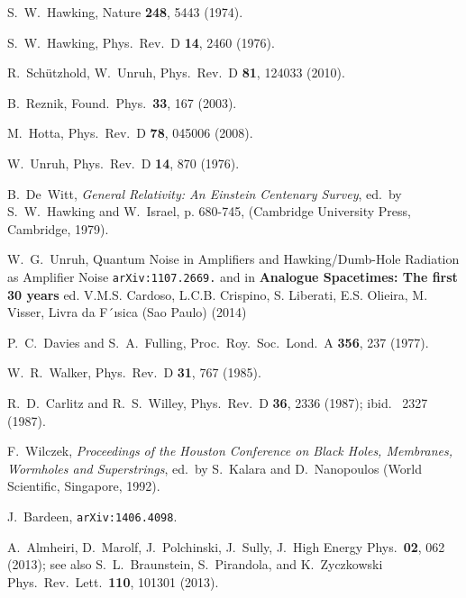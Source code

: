 \documentclass[aps,prd,showpacs,amssymb,nofootinbib,12pt]{revtex4-2}
\begin{document}
\begin{thebibliography}{000}

S.\  W.\ Hawking, Nature {\bf 248}, 5443 (1974). 

S.\ W.\ Hawking, Phys.\ Rev.\ D {\bf 14}, 2460 (1976).  

R.\ Sch\"utzhold, W.\ Unruh, Phys.\ Rev.\ D {\bf 81}, 124033 (2010). 

B.\ Reznik, Found.\ Phys.\ {\bf 33}, 167 (2003). 

M.\ Hotta, Phys.\ Rev.\ D {\bf 78}, 045006 (2008). 

W.\ Unruh, Phys.\ Rev.\ D {\bf 14}, 870 (1976). 

B.\ De~Witt, {\it General Relativity: An Einstein Centenary Survey}, 
ed.\ by S.\ W.\ Hawking and W.\ Israel, p. 680-745, 
(Cambridge University Press, Cambridge, 1979).

W.~G.~Unruh,
Quantum Noise in Amplifiers and Hawking/Dumb-Hole Radiation as Amplifier Noise
{\tt arXiv:1107.2669.} 
and in  {\bf Analogue Spacetimes: The first 30 years} ed.  V.M.S. Cardoso, L.C.B.
Crispino, S. Liberati, E.S. Olieira, M. Visser, Livra da F´ısica (Sao Paulo)
(2014)  

P.~C.~Davies and S.~A.~Fulling,
Proc.\ Roy.\ Soc.\ Lond.\ A {\bf 356}, 237 (1977).

W.~R.~Walker,
Phys.\ Rev.\ D {\bf 31}, 767 (1985).

R.\ D.\ Carlitz and R.\ S.\ Willey, 
Phys.\ Rev.\ D {\bf 36}, 2336 (1987);
%
ibid.\ %
2327 (1987). 

F.\ Wilczek, {\it Proceedings of the Houston Conference on Black Holes, 
Membranes, Wormholes and Superstrings}, ed.\ by S.\ Kalara and D.\ Nanopoulos 
(World Scientific, Singapore, 1992).

J.\ Bardeen, {\tt arXiv:1406.4098}. 

A.\ Almheiri, D.\ Marolf, J.\ Polchinski, J.\ Sully, 
J.\ High Energy Phys.\ {\bf 02}, 062 (2013); see also 
S.~L.~Braunstein, S.~Pirandola, and K.~Zyczkowski
Phys.\ Rev.\ Lett.\ {\bf 110}, 101301 (2013). 

\end{thebibliography}
\end{document}
